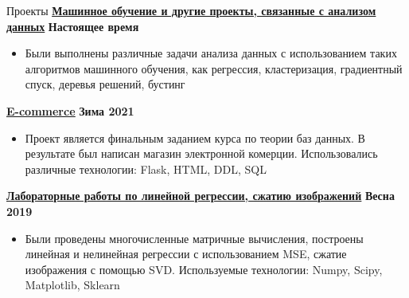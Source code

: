 \documentclass{resume} %
\begin{document}
\begin{rSection}{Проекты}
{\bf \href{https://github.com/MazeBraker/HSE_study/tree/master/3_year}{\underline{Машинное обучение и другие проекты, связанные с анализом данных}}} \hfill {\bf Настоящее время}
\begin{itemize}
\item Были выполнены различные задачи анализа данных с использованием таких алгоритмов машинного обучения, как регрессия, кластеризация, градиентный спуск, деревья решений, бустинг
\end{itemize}
{\bf \href{https://github.com/MazeBraker/HSE_study/tree/master/3_year/Theory_of_databases}{\underline {E-commerce}}} \hfill {\bf Зима 2021} 
\begin{itemize}
\item Проект является финальным заданием курса по теории баз данных. В результате был написан магазин электронной комерции. Использовались различные технологии: Flask, HTML, DDL, SQL
\end{itemize}
{\bf \href{https://github.com/MazeBraker/HSE_study/tree/master/1_year/Linear_algebra}{\underline {Лабораторные работы по линейной регрессии, сжатию изображений}}} \hfill {\bf Весна 2019} 
\begin{itemize}
\item Были проведены многочисленные матричные вычисления, построены линейная и нелинейная регрессии с использованием MSE, сжатие изображения с помощью SVD. Используемые технологии: Numpy, Scipy, Matplotlib, Sklearn
\end{itemize}
\end{rSection}



\end{document}
